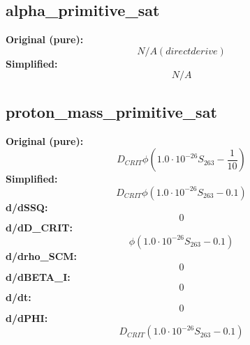 \subsection{alpha_primitive_sat}
\textbf{Original (pure):}
\begin{equation}
N/A (direct derive)
\end{equation}
\textbf{Simplified:}
\begin{equation}
N/A
\end{equation}

\subsection{proton_mass_primitive_sat}
\textbf{Original (pure):}
\begin{equation}
D_{CRIT} \phi \left(1.0 \cdot 10^{-26} S_{26 3} - \frac{1}{10}\right)
\end{equation}
\textbf{Simplified:}
\begin{equation}
D_{CRIT} \phi \left(1.0 \cdot 10^{-26} S_{26 3} - 0.1\right)
\end{equation}
\textbf{d/dSSQ:}
\begin{equation}
0
\end{equation}
\textbf{d/dD_CRIT:}
\begin{equation}
\phi \left(1.0 \cdot 10^{-26} S_{26 3} - 0.1\right)
\end{equation}
\textbf{d/drho_SCM:}
\begin{equation}
0
\end{equation}
\textbf{d/dBETA_I:}
\begin{equation}
0
\end{equation}
\textbf{d/dt:}
\begin{equation}
0
\end{equation}
\textbf{d/dPHI:}
\begin{equation}
D_{CRIT} \left(1.0 \cdot 10^{-26} S_{26 3} - 0.1\right)
\end{equation}

